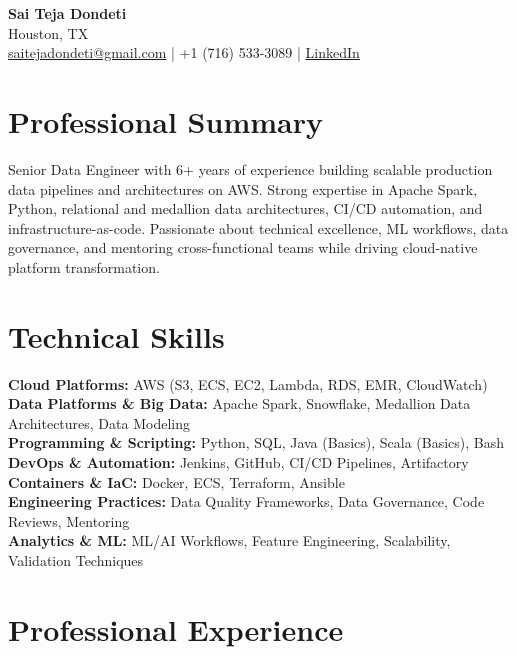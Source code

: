 \documentclass[10pt]{article} %
\begin{document}
\begin{center}
    {\LARGE \textbf{Sai Teja Dondeti}} \\
    \vspace{2pt}
    Houston, TX \\
    \href{mailto:saitejadondeti@gmail.com}{saitejadondeti@gmail.com} \;|\;
    +1 (716) 533-3089 \;|\; %
    \href{https://www.linkedin.com/in/sai-teja-dondeti/}{LinkedIn}
\end{center}

\section*{Professional Summary}
Senior Data Engineer with 6+ years of experience building scalable production data pipelines and architectures on AWS. %
Strong expertise in Apache Spark, Python, relational and medallion data architectures, CI/CD automation, and infrastructure-as-code. %
Passionate about technical excellence, ML workflows, data governance, and mentoring cross-functional teams while driving cloud-native platform transformation. %

\section*{Technical Skills}

\textbf{Cloud Platforms:} AWS (S3, ECS, EC2, Lambda, RDS, EMR, CloudWatch) \\
\textbf{Data Platforms \& Big Data:} Apache Spark, Snowflake, Medallion Data Architectures, Data Modeling \\
\textbf{Programming \& Scripting:} Python, SQL, Java (Basics), Scala (Basics), Bash \\
\textbf{DevOps \& Automation:} Jenkins, GitHub, CI/CD Pipelines, Artifactory \\
\textbf{Containers \& IaC:} Docker, ECS, Terraform, Ansible \\
\textbf{Engineering Practices:} Data Quality Frameworks, Data Governance, Code Reviews, Mentoring \\
\textbf{Analytics \& ML:} ML/AI Workflows, Feature Engineering, Scalability, Validation Techniques

\section*{Professional Experience}
\end{document}
